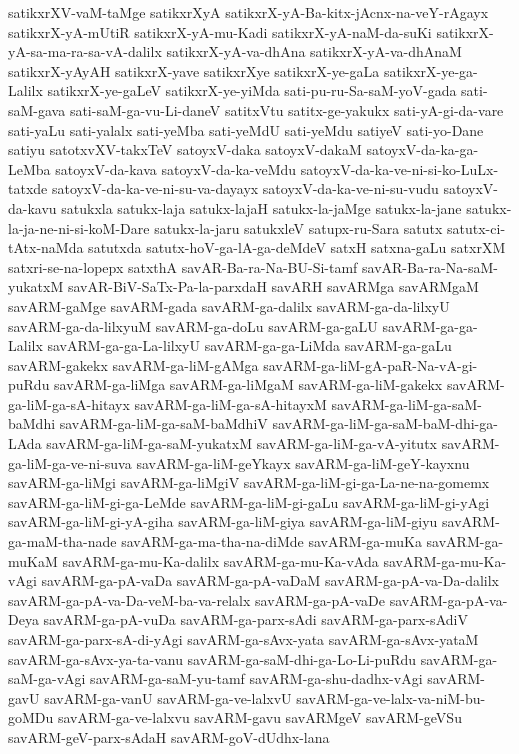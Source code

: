 {satikxrXV-vaM-taMge
satikxrXyA
satikxrX-yA-Ba-kitx-jAcnx-na-veY-rAgayx
satikxrX-yA-mUtiR
satikxrX-yA-mu-Kadi
satikxrX-yA-naM-da-suKi
satikxrX-yA-sa-ma-ra-sa-vA-dalilx
satikxrX-yA-va-dhAna
satikxrX-yA-va-dhAnaM
satikxrX-yAyAH
satikxrX-yave
satikxrXye
satikxrX-ye-gaLa
satikxrX-ye-ga-Lalilx
satikxrX-ye-gaLeV
satikxrX-ye-yiMda
sati-pu-ru-Sa-saM-yoV-gada
sati-saM-gava
sati-saM-ga-vu-Li-daneV
satitxVtu
satitx-ge-yakukx
sati-yA-gi-da-vare
sati-yaLu
sati-yalalx
sati-yeMba
sati-yeMdU
sati-yeMdu
satiyeV
sati-yo-Dane
satiyu
satotxvXV-takxTeV
satoyxV-daka
satoyxV-dakaM
satoyxV-da-ka-ga-LeMba
satoyxV-da-kava
satoyxV-da-ka-veMdu
satoyxV-da-ka-ve-ni-si-ko-LuLx-tatxde
satoyxV-da-ka-ve-ni-su-va-dayayx
satoyxV-da-ka-ve-ni-su-vudu
satoyxV-da-kavu
satukxla
satukx-laja
satukx-lajaH
satukx-la-jaMge
satukx-la-jane
satukx-la-ja-ne-ni-si-koM-Dare
satukx-la-jaru
satukxleV
satupx-ru-Sara
satutx
satutx-ci-tAtx-naMda
satutxda
satutx-hoV-ga-lA-ga-deMdeV
satxH
satxna-gaLu
satxrXM
satxri-se-na-lopepx
satxthA
savAR-Ba-ra-Na-BU-Si-tamf
savAR-Ba-ra-Na-saM-yukatxM
savAR-BiV-SaTx-Pa-la-parxdaH
savARH
savARMga
savARMgaM
savARM-gaMge
savARM-gada
savARM-ga-dalilx
savARM-ga-da-lilxyU
savARM-ga-da-lilxyuM
savARM-ga-doLu
savARM-ga-gaLU
savARM-ga-ga-Lalilx
savARM-ga-ga-La-lilxyU
savARM-ga-ga-LiMda
savARM-ga-gaLu
savARM-gakekx
savARM-ga-liM-gAMga
savARM-ga-liM-gA-paR-Na-vA-gi-puRdu
savARM-ga-liMga
savARM-ga-liMgaM
savARM-ga-liM-gakekx
savARM-ga-liM-ga-sA-hitayx
savARM-ga-liM-ga-sA-hitayxM
savARM-ga-liM-ga-saM-baMdhi
savARM-ga-liM-ga-saM-baMdhiV
savARM-ga-liM-ga-saM-baM-dhi-ga-LAda
savARM-ga-liM-ga-saM-yukatxM
savARM-ga-liM-ga-vA-yitutx
savARM-ga-liM-ga-ve-ni-suva
savARM-ga-liM-geYkayx
savARM-ga-liM-geY-kayxnu
savARM-ga-liMgi
savARM-ga-liMgiV
savARM-ga-liM-gi-ga-La-ne-na-gomemx
savARM-ga-liM-gi-ga-LeMde
savARM-ga-liM-gi-gaLu
savARM-ga-liM-gi-yAgi
savARM-ga-liM-gi-yA-giha
savARM-ga-liM-giya
savARM-ga-liM-giyu
savARM-ga-maM-tha-nade
savARM-ga-ma-tha-na-diMde
savARM-ga-muKa
savARM-ga-muKaM
savARM-ga-mu-Ka-dalilx
savARM-ga-mu-Ka-vAda
savARM-ga-mu-Ka-vAgi
savARM-ga-pA-vaDa
savARM-ga-pA-vaDaM
savARM-ga-pA-va-Da-dalilx
savARM-ga-pA-va-Da-veM-ba-va-relalx
savARM-ga-pA-vaDe
savARM-ga-pA-va-Deya
savARM-ga-pA-vuDa
savARM-ga-parx-sAdi
savARM-ga-parx-sAdiV
savARM-ga-parx-sA-di-yAgi
savARM-ga-sAvx-yata
savARM-ga-sAvx-yataM
savARM-ga-sAvx-ya-ta-vanu
savARM-ga-saM-dhi-ga-Lo-Li-puRdu
savARM-ga-saM-ga-vAgi
savARM-ga-saM-yu-tamf
savARM-ga-shu-dadhx-vAgi
savARM-gavU
savARM-ga-vanU
savARM-ga-ve-lalxvU
savARM-ga-ve-lalx-va-niM-bu-goMDu
savARM-ga-ve-lalxvu
savARM-gavu
savARMgeV
savARM-geVSu
savARM-geV-parx-sAdaH
savARM-goV-dUdhx-lana
}

